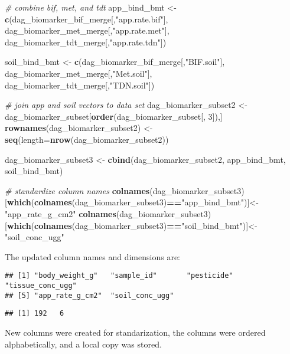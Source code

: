 \documentclass[
]{article}
\newenvironment{Shaded}{\begin{snugshade}}{\end{snugshade}}
\newcommand{\CommentTok}[1]{\textcolor[rgb]{0.56,0.35,0.01}{\textit{#1}}}
\newcommand{\DataTypeTok}[1]{\textcolor[rgb]{0.13,0.29,0.53}{#1}}
\newcommand{\DecValTok}[1]{\textcolor[rgb]{0.00,0.00,0.81}{#1}}
\newcommand{\KeywordTok}[1]{\textcolor[rgb]{0.13,0.29,0.53}{\textbf{#1}}}
\newcommand{\NormalTok}[1]{#1}
\newcommand{\OperatorTok}[1]{\textcolor[rgb]{0.81,0.36,0.00}{\textbf{#1}}}
\newcommand{\StringTok}[1]{\textcolor[rgb]{0.31,0.60,0.02}{#1}}
\begin{document}
\begin{Shaded}
\begin{Highlighting}[]
\CommentTok{# combine bif, met, and tdt}
\NormalTok{app_bind_bmt <-}\StringTok{ }\KeywordTok{c}\NormalTok{(dag_biomarker_bif_merge[,}\StringTok{"app.rate.bif"}\NormalTok{], }
\NormalTok{                  dag_biomarker_met_merge[,}\StringTok{"app.rate.met"}\NormalTok{], dag_biomarker_tdt_merge[,}\StringTok{"app.rate.tdn"}\NormalTok{])}

\NormalTok{soil_bind_bmt <-}\StringTok{ }\KeywordTok{c}\NormalTok{(dag_biomarker_bif_merge[,}\StringTok{"BIF.soil"}\NormalTok{], }
\NormalTok{                   dag_biomarker_met_merge[,}\StringTok{"Met.soil"}\NormalTok{], dag_biomarker_tdt_merge[,}\StringTok{"TDN.soil"}\NormalTok{]) }


\CommentTok{# join app and soil vectors to data set}
\NormalTok{dag_biomarker_subset2 <-}\StringTok{ }\NormalTok{dag_biomarker_subset[}\KeywordTok{order}\NormalTok{(dag_biomarker_subset[, }\DecValTok{3}\NormalTok{]),]}
\KeywordTok{rownames}\NormalTok{(dag_biomarker_subset2) <-}\StringTok{ }\KeywordTok{seq}\NormalTok{(}\DataTypeTok{length=}\KeywordTok{nrow}\NormalTok{(dag_biomarker_subset2))}

\NormalTok{dag_biomarker_subset3 <-}\StringTok{ }\KeywordTok{cbind}\NormalTok{(dag_biomarker_subset2, app_bind_bmt, soil_bind_bmt)}

\CommentTok{# standardize column names}
\KeywordTok{colnames}\NormalTok{(dag_biomarker_subset3)[}\KeywordTok{which}\NormalTok{(}\KeywordTok{colnames}\NormalTok{(dag_biomarker_subset3)}\OperatorTok{==}\StringTok{"app_bind_bmt"}\NormalTok{)]<-}\StringTok{"app_rate_g_cm2"}
\KeywordTok{colnames}\NormalTok{(dag_biomarker_subset3)[}\KeywordTok{which}\NormalTok{(}\KeywordTok{colnames}\NormalTok{(dag_biomarker_subset3)}\OperatorTok{==}\StringTok{"soil_bind_bmt"}\NormalTok{)]<-}\StringTok{"soil_conc_ugg"}
\end{Highlighting}
\end{Shaded}

The updated column names and dimensions are:

\begin{verbatim}
## [1] "body_weight_g"   "sample_id"       "pesticide"       "tissue_conc_ugg"
## [5] "app_rate_g_cm2"  "soil_conc_ugg"
\end{verbatim}

\begin{verbatim}
## [1] 192   6
\end{verbatim}

New columns were created for standarization, the columns were ordered
alphabetically, and a local copy was stored.
\end{document}

